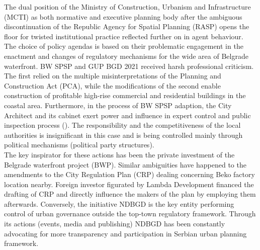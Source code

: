 \documentclass[11pt]{report}
\begin{document}
The dual position of the Ministry of Construction, Urbanism and Infrastructure (MCTI) as both normative and executive planning body after the ambiguous discontinuation of the Republic Agency for Spatial Planning (RASP) opens the floor for twisted institutional practice reflected further on in agent behaviour. The choice of policy agendas is based on their problematic engagement in the enactment and changes of regulatory mechanisms for the wide area of Belgrade waterfront.
BW SPSP and GUP BGD 2021 received harsh professional criticism. The first relied on the multiple misinterpretations of the Planning and Construction Act (PCA), while the modifications of the second enable construction of profitable high-rise commercial and residential buildings in the coastal area. Furthermore, in the process of BW SPSP adaption, the City Architect and its cabinet exert power and influence in expert control and public inspection process (\cite{ref(NDVBG docs)}).
The responsibility and the competitiveness of the local authorities is insignificant in this case and is being controlled mainly through political mechanisms (political party structures). 
\\

The key inspirator for these actions has been the private investment of the Belgrade waterfront project (BWP).
Similar ambiguities have happened to the amendments to the City Regulation Plan (CRP) dealing concerning Beko factory location nearby. Foreign investor figurated by Lambda Development financed the drafting of CRP and directly influence the makers of the plan by employing them afterwards. Conversely, the initiative NDBGD is the key entity performing control of urban governance outside the top-town regulatory framework. Through its actions (events, media and publishing) NDBGD has been constantly advocating for more transparency and participation in Serbian urban planning framework.
\\
\end{document}
